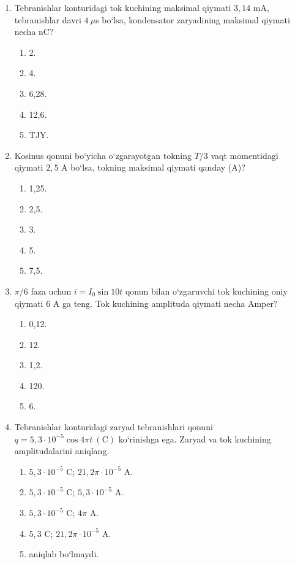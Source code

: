 \begin{enumerate}
\item Tebranishlar konturidagi tok kuchining maksimal qiymati $3,14$ mA, tebranishlar davri $4~\mu$s bo‘lsa, kondensator zaryadining maksimal qiymati necha nC?
\begin{enumerate}[label=\Alph*)]
\item 2.
\item 4.
\item 6,28.
\item 12,6.
\item TJY.
\end{enumerate}

\item Kosinus qonuni bo‘yicha o‘zgarayotgan tokning $T/3$ vaqt momentidagi qiymati $2,5$ A bo‘lsa, tokning maksimal qiymati qanday (A)?
\begin{enumerate}[label=\Alph*)]
\item 1,25.
\item 2,5.
\item 3.
\item 5.
\item 7,5.
\end{enumerate}

\item $\pi/6$ faza uchun $i=I_0\sin10t$ qonun bilan o‘zgaruvchi tok kuchining oniy qiymati $6$ A ga teng. Tok kuchining amplituda qiymati necha Amper?
\begin{enumerate}[label=\Alph*)]
\item 0,12.
\item 12.
\item 1,2.
\item 120.
\item 6.
\end{enumerate}

\item Tebranishlar konturidagi zaryad tebranishlari qonuni $q=5,3\cdot10^{-5}\cos4\pi t \ (\text{C})$ ko‘rinishga ega. Zaryad va tok kuchining amplitudalarini aniqlang.
\begin{enumerate}[label=\Alph*)]
\item $5,3\cdot10^{-5}$ C; $21,2\pi\cdot10^{-5}$ A.
\item $5,3\cdot10^{-5}$ C; $5,3\cdot10^{-5}$ A.
\item $5,3\cdot10^{-5}$ C; $4\pi$ A.
\item $5,3$ C; $21,2\pi\cdot10^{-5}$ A.
\item aniqlab bo‘lmaydi.
\end{enumerate}


\end{enumerate}
